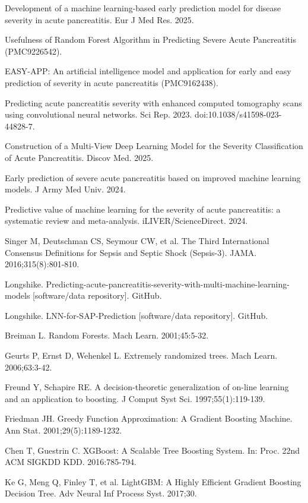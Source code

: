 \documentclass[twoside,11pt]{article}
\begin{document}
\begin{small}
\noindent [13] Development of a machine learning-based early prediction model for disease severity in acute pancreatitis. Eur J Med Res. 2025.

\noindent [14] Usefulness of Random Forest Algorithm in Predicting Severe Acute Pancreatitis (PMC9226542).

\noindent [15] EASY-APP: An artificial intelligence model and application for early and easy prediction of severity in acute pancreatitis (PMC9162438).

\noindent [16] Predicting acute pancreatitis severity with enhanced computed tomography scans using convolutional neural networks. Sci Rep. 2023. doi:10.1038/s41598-023-44828-7.

\noindent [17] Construction of a Multi-View Deep Learning Model for the Severity Classification of Acute Pancreatitis. Discov Med. 2025.

\noindent [18] Early prediction of severe acute pancreatitis based on improved machine learning models. J Army Med Univ. 2024.

\noindent [19] Predictive value of machine learning for the severity of acute pancreatitis: a systematic review and meta-analysis. iLIVER/ScienceDirect. 2024.

\noindent [20] Singer M, Deutschman CS, Seymour CW, et al. The Third International Consensus Definitions for Sepsis and Septic Shock (Sepsis-3). JAMA. 2016;315(8):801-810.

\noindent [21] Longshike. Predicting-acute-pancreatitis-severity-with-multi-machine-learning-models [software/data repository]. GitHub.

\noindent [22] Longshike. LNN-for-SAP-Prediction [software/data repository]. GitHub.

\noindent [23] Breiman L. Random Forests. Mach Learn. 2001;45:5-32.

\noindent [24] Geurts P, Ernst D, Wehenkel L. Extremely randomized trees. Mach Learn. 2006;63:3-42.

\noindent [25] Freund Y, Schapire RE. A decision-theoretic generalization of on-line learning and an application to boosting. J Comput Syst Sci. 1997;55(1):119-139.

\noindent [26] Friedman JH. Greedy Function Approximation: A Gradient Boosting Machine. Ann Stat. 2001;29(5):1189-1232.

\noindent [27] Chen T, Guestrin C. XGBoost: A Scalable Tree Boosting System. In: Proc. 22nd ACM SIGKDD KDD. 2016:785-794.

\noindent [28] Ke G, Meng Q, Finley T, et al. LightGBM: A Highly Efficient Gradient Boosting Decision Tree. Adv Neural Inf Process Syst. 2017;30.


\end{small}
\end{document}
